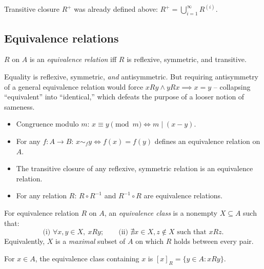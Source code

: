 \begin{note}
Transitive closure $R^+$ was already defined above: $R^+=\bigcup_{i=1}^\infty R^{(i)}$.
\end{note}

\subsection{Equivalence relations}
\label{sec:2-16}

\begin{definition}
$R$ on $A$ is an \emph{equivalence relation} iff $R$ is reflexive, symmetric, and transitive.
\end{definition}

\begin{note}
Equality is reflexive, symmetric, \emph{and} antisymmetric. But requiring antisymmetry of a general equivalence relation would force $xRy \wedge yRx \implies x=y$ -- collapsing ``equivalent'' into ``identical,'' which defeats the purpose of a looser notion of sameness.
\end{note}

\begin{example}
\begin{itemize}
    \item Congruence modulo $m$: $x \equiv y \pmod{m} \iff m \mid (x-y)$.
    \item For any $f: A \to B$: $x \sim_f y \iff f(x)=f(y)$ defines an equivalence relation on $A$.
    \item The transitive closure of any reflexive, symmetric relation is an equivalence relation.
    \item For any relation $R$: $R \circ R^{-1}$ and $R^{-1} \circ R$ are equivalence relations.
\end{itemize}
\end{example}

\begin{definition}
For equivalence relation $R$ on $A$, an \emph{equivalence class} is a nonempty $X \subseteq A$ such that:
\[
\text{(i) } \forall x,y \in X,\ xRy; \qquad \text{(ii) } \nexists x \in X, z \notin X \text{ such that } xRz.
\]
Equivalently, $X$ is a \emph{maximal} subset of $A$ on which $R$ holds between every pair.
\end{definition}

\begin{note}
For $x \in A$, the equivalence class containing $x$ is $[x]_R = \{y \in A : xRy\}$.
\end{note}

